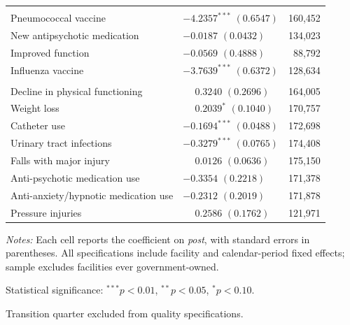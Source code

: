\begin{table}[!ht]
\begin{threeparttable}
\begin{tabularx}{\textwidth}{@{} l Y r @{}}
\addlinespace[4pt]
 \\[2pt]
Pneumococcal vaccine &  & 160,452 \\
New antipsychotic medication &  & 134,023 \\
Improved function &  & 88,792 \\
Influenza vaccine &  & 128,634 \\
\addlinespace[4pt]
 \\[2pt]
Decline in physical functioning &  & 164,005 \\
Weight loss &  & 170,757 \\
Catheter use &  & 172,698 \\
Urinary tract infections &  & 174,408 \\
Falls with major injury &  & 175,150 \\
Anti-psychotic medication use &  & 171,378 \\
Anti-anxiety/hypnotic medication use &  & 171,878 \\
Pressure injuries &  & 121,971 \\
\bottomrule
\end{tabularx}

\begin{tablenotes}[flushleft]
\footnotesize
\item \textit{Notes:} Each cell reports the coefficient on \textit{post}, with standard errors in parentheses. All specifications include facility and calendar-period fixed effects; sample excludes facilities ever government-owned.
\item Statistical significance: $^{***}p<0.01$, $^{**}p<0.05$, $^{*}p<0.10$.
\item Transition quarter excluded from quality specifications.
\end{tablenotes}
\end{threeparttable}
\end{table}

